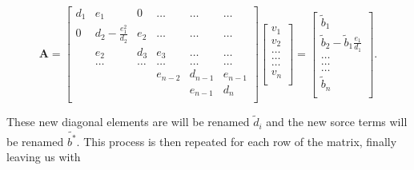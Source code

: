 \documentclass[%
oneside,                 %
final,                   %
10pt]{article}
\begin{document}
\[
    \mathbf{A} = \begin{bmatrix}
                           d_1& e_1 & 0 &\dots   & \dots &\dots \\
                           0 & d_2-\frac{e_1^2}{d_2} & e_2 &\dots &\dots &\dots \\
                           & e_2 & d_3 & e_3 & \dots & \dots \\
                           & \dots   & \dots &\dots   &\dots & \dots \\
                           &   &  &e_{n-2}  &d_{n-1}& e_{n-1} \\
                           &    &  &   &e_{n-1} & d_n \\
                      \end{bmatrix}\begin{bmatrix}
                           v_1\\
                           v_2\\
                           \dots \\
                          \dots  \\
                          \dots \\
                           v_n\\
                      \end{bmatrix}
  =\begin{bmatrix}
                           \tilde{b}_1\\
                           \tilde{b}_2-\tilde{b}_1\frac{e_1}{d_1}\\
                           \dots \\
                           \dots \\
                          \dots \\
                           \tilde{b}_n\\
                      \end{bmatrix}.
\]

These new diagonal elements are will be renamed $\tilde{d}_i$ and the new sorce terms will be renamed $\tilde{b^*}$.  This process is then repeated for each row of the matrix, finally leaving us with
\end{document}
